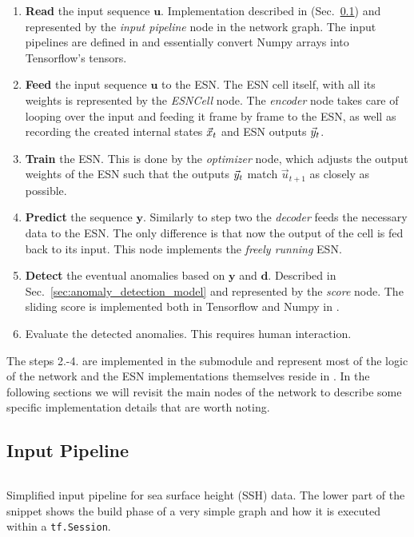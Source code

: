 \begin{enumerate}
  \item \textbf{Read} the input sequence $\mathbf{u}$. Implementation described
    in (Sec.~\ref{sec:input_pipeline}) and represented by the \emph{input
    pipeline} node in the network graph. The input pipelines are defined in
     and essentially convert Numpy arrays into Tensorflow's
    tensors.

  \item \textbf{Feed} the input sequence $\mathbf{u}$ to the ESN. The ESN cell
    itself, with all its weights is represented by the \emph{ESNCell} node. The
    \emph{encoder} node takes care of looping over the input and feeding it
    frame by frame to the ESN, as well as recording the created internal states
    $\vec{x}_t$ and ESN outputs $\vec{y}_t$.

  \item \textbf{Train} the ESN. This is done by the \emph{optimizer} node, which adjusts
    the output weights of the ESN such that the outputs $\vec{y}_t$ match
    $\vec{u}_{t+1}$ as closely as possible.

  \item \textbf{Predict} the sequence $\mathbf{y}$.  Similarly to step two the
    \emph{decoder} feeds the necessary data to the ESN.  The only difference is
    that now the output of the cell is fed back to its input. This node implements
    the \emph{freely running} ESN.

  \item \textbf{Detect} the eventual anomalies based on $\mathbf{y}$ and
    $\mathbf{d}$.  Described in Sec.~\ref{sec:anomaly_detection_model} and
    represented by the \emph{score} node. The sliding score is implemented both
    in Tensorflow and Numpy in .

  \item Evaluate the detected anomalies. This requires human interaction.
\end{enumerate}

The steps 2.-4. are implemented in the  submodule and
represent most of the logic of the network and the ESN implementations
themselves reside in .  In the following sections we will
revisit the main nodes of the network to describe some specific implementation
details that are worth noting.



\subsection{Input Pipeline}%
\label{sec:input_pipeline}
\begin{listing}
  \inputminted{py}{pseudocode/input_pipeline.py}
  \caption{Simplified input pipeline for sea surface height (SSH) data. The
  lower part of the snippet shows the build phase of a very simple graph and
  how it is executed within a \texttt{tf.Session}.}
  \label{lst:pipeline}
\end{listing}


